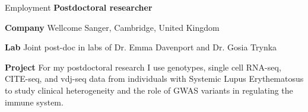 \begin{rubric}{Employment}
%
%
%
\textbf{Postdoctoral researcher} \par
\textbf{Company} Wellcome Sanger, Cambridge, United Kingdom \par
\textbf{Lab} Joint post-doc in labs of Dr. Emma Davenport and Dr. Gosia Trynka\par

\textbf{Project} For my postdoctoral research I use genotypes, single cell RNA-seq, CITE-seq, and vdj-seq data from individuals with Systemic Lupus Erythematosus to study clinical heterogeneity and the role of GWAS variants in regulating the immune system.
\end{rubric}
